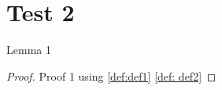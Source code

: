 \chapter{Test 2}\label{chap:test2}

\begin{lemma}\label{lem:lem1}
  \leanok
  Lemma 1
\end{lemma}
\begin{proof}
  Proof 1 using \ref{def:def1} \ref{def: def2}
\end{proof}